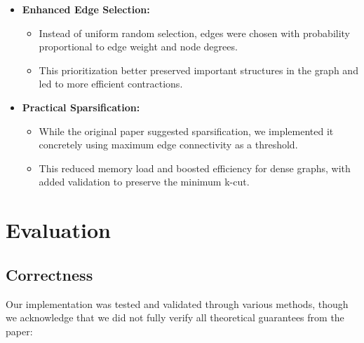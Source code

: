 \documentclass[11pt]{article}
\begin{document}
\begin{itemize}
    \item \textbf{Enhanced Edge Selection:}
    \begin{itemize}
        \item Instead of uniform random selection, edges were chosen with probability proportional to edge weight and node degrees.
        \item This prioritization better preserved important structures in the graph and led to more efficient contractions.
    \end{itemize}

    \item \textbf{Practical Sparsification:}
    \begin{itemize}
        \item While the original paper suggested sparsification, we implemented it concretely using maximum edge connectivity as a threshold.
        \item This reduced memory load and boosted efficiency for dense graphs, with added validation to preserve the minimum k-cut.
    \end{itemize}
\end{itemize}

\section{Evaluation}

\subsection{Correctness}

Our implementation was tested and validated through various methods, though we acknowledge that we did not fully verify all theoretical guarantees from the paper:
\end{document}
